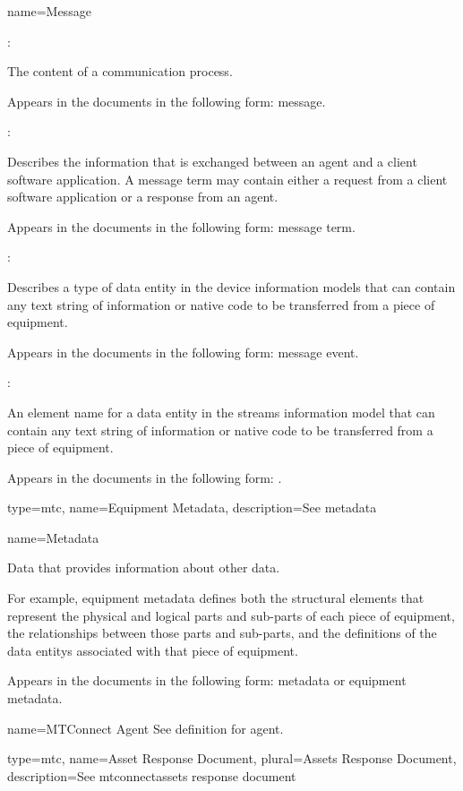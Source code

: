 {
  name={Message}
}
{
	:

	The content of a communication process.

	Appears in the documents in the following form: message.

	:

	Describes the information that is exchanged between an \gls{agent} and a client software application.  A \gls{message term} may contain either a \gls{request} from a client software application or a \gls{response} from an \gls{agent}.

	Appears in the documents in the following form: \gls{message term}.

	:

	Describes a type of \gls{data entity} in the \glspl{device information model} that can contain any text string of information or native code to be transferred from a piece of equipment.

	Appears in the documents in the following form: \gls{message event}.

	:

	An \gls{element name} for a \gls{data entity} in the \gls{streams information model} that can contain any text string of information or native code to be transferred from a piece of equipment.

	Appears in the documents in the following form:  .
}


{
  type=mtc,
  name={Equipment Metadata},
  description={See \gls{metadata}}
}


{
  name={Metadata}
}
{
	Data that provides information about other data.

	For example, \gls{equipment metadata} defines both the \glspl{structural element} that represent the physical and logical parts and sub-parts of each piece of equipment, the relationships between those parts and sub-parts, and the definitions of the \glspl{data entity} associated with that piece of equipment.

	Appears in the documents in the following form: \gls{metadata} or \gls{equipment metadata}.
}


{
  name={MTConnect Agent}
}
{
	See definition for \gls{agent}.
}


{
  type=mtc,
  name={Asset Response Document},
  plural={Assets Response Document},
  description={See \gls{mtconnectassets response document}}
}

